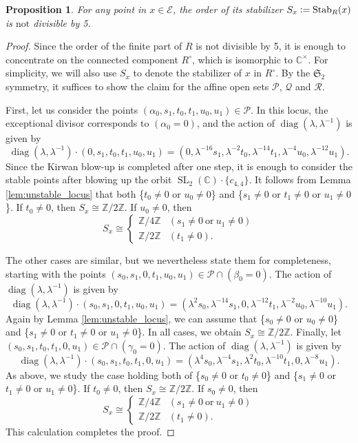 \documentclass[12pt, pdftex]{amsart}
\theoremstyle{plain}
\newtheorem{prop}[thm]{Proposition}
\theoremstyle{definition}
\numberwithin{equation}{section}
\def\Z{{\mathbb Z}}
\def\C{{\mathbb C}}
\def\SS{{\mathfrak S}}
\def\SL{\mathop{\mathrm{SL}}\nolimits}
\def\Stab{\mathop{\mathrm{Stab}}\nolimits}
\def\diag{\mathop{\mathrm{diag}}\nolimits}
\def\E{\mathscr{E}}
\def\a{\alpha}
\newcommand{\defeq}{\vcentcolon=}
\begin{document}
\begin{prop}
\label{prop:e_not_divisible_by_5}
For any point in $x\in\E$, the order of its stabilizer $S_x\defeq \Stab_R(x)$ is $\mathrm{not}$ divisible by 5.
\end{prop}
\begin{proof}
Since the order of the finite part of $R$ is not divisible by 5, it is enough to concentrate on the connected component $R^{\circ}$, which is isomorphic to $\C^{\times}$.
For simplicity, we will also use  $S_x$ to denote the stabilizer of $x$ in $R^{\circ}$.
By the $\SS_2$ symmetry, it suffices to show the claim for the affine open sets $\mathcal{P}$, $\mathcal{Q}$ and $\mathcal{R}$.

First, let us consider the points $(\a_0,s_1,t_0,t_1,u_0,u_1)\in\mathcal{P}$.
In this locus, the exceptional divisor corresponds to $(\a_0=0)$, and the action of $\diag(\lambda,\lambda^{-1})$ is given by 
\[\diag(\lambda,\lambda^{-1})\cdot(0,s_1,t_0,t_1,u_0,u_1)=(0,\lambda^{-16}s_1,\lambda^{-2}t_0,\lambda^{-14}t_1,\lambda^{-4}u_0,\lambda^{-12}u_1).\]
Since the Kirwan blow-up is completed after one step, it is enough to consider the stable points after blowing up the orbit $\SL_2(\C)\cdot \{c_{4,4}\}$.
It follows from Lemma \ref{lem:unstable_locus} that 
both \{$t_0\neq 0$ or $u_0\neq 0$\} and \{$s_1\neq 0$ or $t_1\neq 0$ or $u_1\neq 0$\}.
If $t_0\neq 0$, then $S_x\cong\Z/2\Z$.
If $u_0\neq 0$, then 
\[S_x\cong\begin{cases}
\Z/4\Z&(s_1\neq 0\ \mathrm{or}\ u_1\neq 0)\\
\Z/2\Z&(t_1\neq 0).
\end{cases}
\]

The other cases are similar, but we nevertheless state them for completeness, starting with the points $(s_0,s_1,0,t_1,u_0,u_1)\in\mathcal{P}\cap (\beta_0=0)$.
The action of $\diag(\lambda,\lambda^{-1})$ is given by 
\[\diag(\lambda,\lambda^{-1})\cdot(s_0,s_1,0,t_1,u_0,u_1)=(\lambda^2s_0,\lambda^{-14}s_1,0,\lambda^{-12}t_1,\lambda^{-2}u_0,\lambda^{-10}u_1).\]
Again by Lemma \ref{lem:unstable_locus}, we can assume that \{$s_0\neq 0$ or  $u_0\neq 0$\} and \{$s_1\neq 0$ or $t_1\neq 0$ or $u_1\neq 0$\}.
In all cases, we obtain $S_x\cong \Z/2\Z$.
Finally, let $(s_0,s_1,t_0,t_1,0,u_1)\in\mathcal{P}\cap (\gamma_0=0)$.
The action of $\diag(\lambda,\lambda^{-1})$ is given by 
\[\diag(\lambda,\lambda^{-1})\cdot(s_0,s_1,t_0,t_1,0,u_1)=(\lambda^4s_0,\lambda^{-4}s_1,\lambda^2t_0,\lambda^{-10}t_1,0,\lambda^{-8}u_1).\]
As above, we study the case holding both of \{$s_0\neq 0$ or $t_0\neq 0$\} and \{$s_1\neq 0$ or $t_1\neq 0$ or $u_1\neq 0$\}.
If $t_0\neq 0$, then $S_x\cong\Z/2\Z$.
If $s_0\neq 0$, then 
\[S_x\cong\begin{cases}
\Z/4\Z&(s_1\neq 0\ \mathrm{or}\ u_1\neq 0)\\
\Z/2\Z&(t_1\neq 0).
\end{cases}
\]
This calculation completes the proof.

\end{proof}
\end{document}
